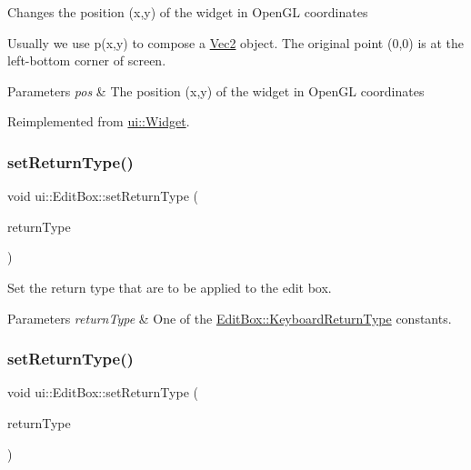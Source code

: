 Changes the position (x,y) of the widget in Open\+GL coordinates

Usually we use p(x,y) to compose a \hyperlink{classVec2}{Vec2} object. The original point (0,0) is at the left-\/bottom corner of screen.


\begin{DoxyParams}{Parameters}
{\em pos} & The position (x,y) of the widget in Open\+GL coordinates \\
\hline
\end{DoxyParams}


Reimplemented from \hyperlink{classui_1_1Widget_ad1983665a8a2463e77c9ff7e13fcac97}{ui\+::\+Widget}.

\mbox{\label{classui_1_1EditBox_ae2f5a317a5b3bb4b1212cf3a44770e6d}} 
\subsubsection{\texorpdfstring{set\+Return\+Type()}{setReturnType()}\hspace{0.1cm}{\footnotesize\ttfamily [1/2]}}
{\footnotesize\ttfamily void ui\+::\+Edit\+Box\+::set\+Return\+Type (\begin{DoxyParamCaption}\item[{\hyperlink{classui_1_1EditBox_a1e1285b6f742975b26bdeb8108ca6e51}{Edit\+Box\+::\+Keyboard\+Return\+Type}}]{return\+Type }\end{DoxyParamCaption})}

Set the return type that are to be applied to the edit box. 
\begin{DoxyParams}{Parameters}
{\em return\+Type} & One of the \hyperlink{classui_1_1EditBox_a1e1285b6f742975b26bdeb8108ca6e51}{Edit\+Box\+::\+Keyboard\+Return\+Type} constants. \\
\hline
\end{DoxyParams}
\mbox{\label{classui_1_1EditBox_a7f574c7c67fa4779fd34acad947a95ed}} 
\subsubsection{\texorpdfstring{set\+Return\+Type()}{setReturnType()}\hspace{0.1cm}{\footnotesize\ttfamily [2/2]}}
{\footnotesize\ttfamily void ui\+::\+Edit\+Box\+::set\+Return\+Type (\begin{DoxyParamCaption}\item[{\hyperlink{classui_1_1EditBox_a1e1285b6f742975b26bdeb8108ca6e51}{Keyboard\+Return\+Type}}]{return\+Type }\end{DoxyParamCaption})}

